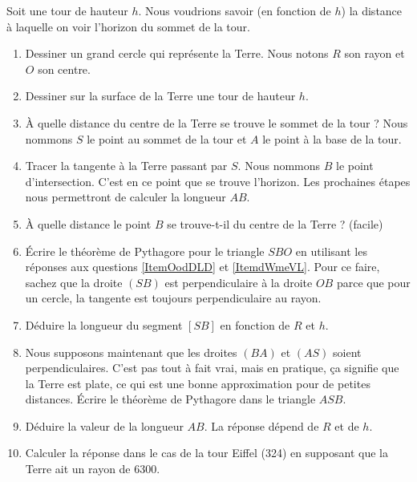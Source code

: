 
\begin{exercice}\label{exoSeconde-0080}


    Soit une tour de hauteur \( h\). Nous voudrions savoir (en fonction de \( h\)) la distance à laquelle on voir l'horizon du sommet de la tour.
    \begin{enumerate}
        \item
            Dessiner un grand cercle qui représente la Terre. Nous notons \( R\) son rayon et \( O\) son centre.
        \item   \label{ItemOodDLD}
            Dessiner sur la surface de la Terre une tour de hauteur \( h\).
        \item
            À quelle distance du centre de la Terre se trouve le sommet de la tour ? Nous nommons \( S\) le point au sommet de la tour et \( A\) le point à la base de la tour.
        \item
            Tracer la tangente à la Terre passant par \( S\). Nous nommons \( B\) le point d'intersection. C'est en ce point que se trouve l'horizon. Les prochaines étapes nous permettront de calculer la longueur \( AB\).
        \item   \label{ItemdWmeVL}
            À quelle distance le point \( B\) se trouve-t-il du centre de la Terre ? (facile)
        \item
            Écrire le théorème de Pythagore pour le triangle \( SBO\) en utilisant les réponses aux questions \ref{ItemOodDLD} et \ref{ItemdWmeVL}. Pour ce faire, sachez que la droite \( (SB)\) est perpendiculaire à la droite \( OB\) parce que pour un cercle, la tangente est toujours perpendiculaire au rayon.
        \item
            Déduire la longueur du segment \( [SB]\) en fonction de \( R\) et \( h\).
        \item
            Nous supposons maintenant que les droites \( (BA)\) et \( (AS)\) soient perpendiculaires. C'est pas tout à fait vrai, mais en pratique, ça signifie que la Terre est plate, ce qui est une bonne approximation pour de petites distances. Écrire le théorème de Pythagore dans le triangle \( ASB\).
        \item
            Déduire la valeur de la longueur \( AB\). La réponse dépend de \( R\) et de \( h\).
        \item
            Calculer la réponse dans le cas de la tour Eiffel (\unit{324}{\meter}) en supposant que la Terre ait un rayon de \unit{6300}{\kilo\meter}.
    \end{enumerate}

\end{exercice}
